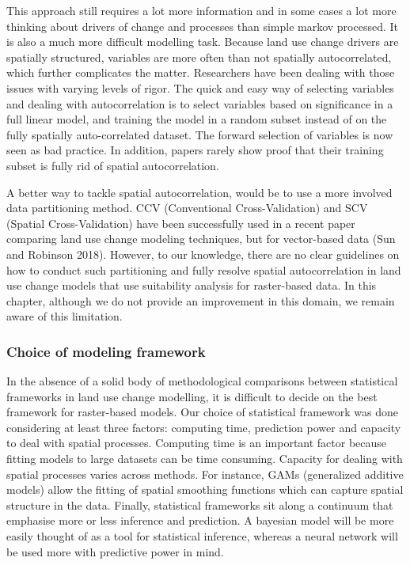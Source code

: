 This approach still requires a lot more information and in some cases a lot more thinking about drivers of change and processes than simple markov processed. It is also a much more difficult modelling task. Because land use change drivers are spatially structured, variables are more often than not spatially autocorrelated, which further complicates the matter. Researchers have been dealing with those issues with varying levels of rigor. The quick and easy way of selecting variables and dealing with autocorrelation is to select variables based on significance in a full linear model, and training the model in a random subset instead of on the fully spatially auto-correlated dataset. The forward selection of variables is now seen as bad practice. In addition, papers rarely show proof that their training subset is fully rid of spatial autocorrelation.

A better way to tackle spatial autocorrelation, would be to use a more involved data partitioning method. CCV (Conventional Cross-Validation) and SCV (Spatial Cross-Validation) have been successfully used in a recent paper comparing land use change modeling techniques, but for vector-based data (Sun and Robinson 2018). However, to our knowledge, there are no clear guidelines on how to conduct such partitioning and fully resolve spatial autocorrelation in land use change models that use suitability analysis for raster-based data. In this chapter, although we do not provide an improvement in this domain, we remain aware of this limitation.\\

\subsubsection{Choice of modeling framework}

In the absence of a solid body of methodological comparisons between statistical frameworks in land use change modelling, it is difficult to decide on the best framework for raster-based models. Our choice of statistical framework was done considering at least three factors: computing time, prediction power and capacity to deal with spatial processes. Computing time is an important factor because fitting models to large datasets can be time consuming. Capacity for dealing with spatial processes varies across methods. For instance, GAMs (generalized additive models) allow the fitting of spatial smoothing functions which can capture spatial structure in the data. Finally, statistical frameworks sit along a continuum that emphasise more or less inference and prediction. A bayesian model will be more easily thought of as a tool for statistical inference, whereas a neural network will be used more with predictive power in mind.

